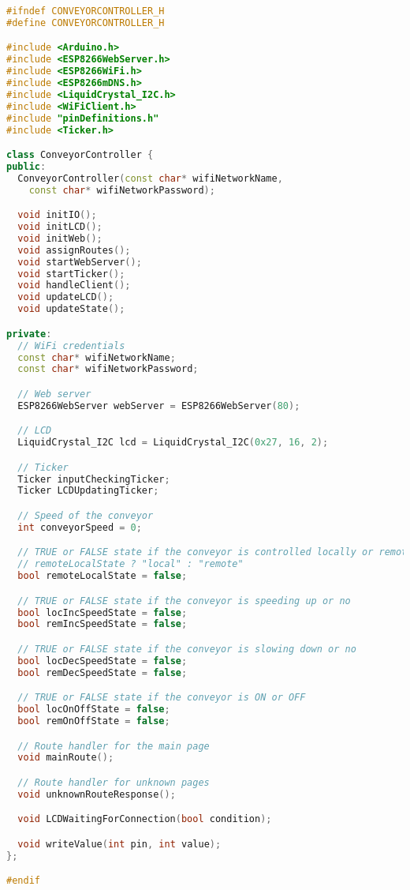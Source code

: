 \begin{lstlisting}[language=C++, caption={Header soubor ConveyorController Objektu}, label={lst:ConveyorControllerHeader}]
#ifndef CONVEYORCONTROLLER_H
#define CONVEYORCONTROLLER_H

#include <Arduino.h>
#include <ESP8266WebServer.h>
#include <ESP8266WiFi.h>
#include <ESP8266mDNS.h>
#include <LiquidCrystal_I2C.h>
#include <WiFiClient.h>
#include "pinDefinitions.h"
#include <Ticker.h>

class ConveyorController {
public:
  ConveyorController(const char* wifiNetworkName,
    const char* wifiNetworkPassword);

  void initIO();
  void initLCD();
  void initWeb();
  void assignRoutes();
  void startWebServer();
  void startTicker();
  void handleClient();
  void updateLCD();
  void updateState();

private:
  // WiFi credentials
  const char* wifiNetworkName;
  const char* wifiNetworkPassword;

  // Web server
  ESP8266WebServer webServer = ESP8266WebServer(80);

  // LCD
  LiquidCrystal_I2C lcd = LiquidCrystal_I2C(0x27, 16, 2);

  // Ticker
  Ticker inputCheckingTicker;
  Ticker LCDUpdatingTicker;

  // Speed of the conveyor
  int conveyorSpeed = 0;

  // TRUE or FALSE state if the conveyor is controlled locally or remotely
  // remoteLocalState ? "local" : "remote"
  bool remoteLocalState = false;

  // TRUE or FALSE state if the conveyor is speeding up or no
  bool locIncSpeedState = false;
  bool remIncSpeedState = false;

  // TRUE or FALSE state if the conveyor is slowing down or no
  bool locDecSpeedState = false;
  bool remDecSpeedState = false;

  // TRUE or FALSE state if the conveyor is ON or OFF
  bool locOnOffState = false;
  bool remOnOffState = false;

  // Route handler for the main page
  void mainRoute();

  // Route handler for unknown pages
  void unknownRouteResponse();

  void LCDWaitingForConnection(bool condition);

  void writeValue(int pin, int value);
};

#endif
\end{lstlisting}
